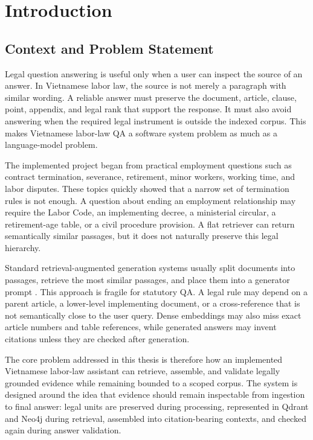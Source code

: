 \section{Introduction}

\subsection{Context and Problem Statement}
Legal question answering is useful only when a user can inspect the source of an answer. In Vietnamese labor law, the source is not merely a paragraph with similar wording. A reliable answer must preserve the document, article, clause, point, appendix, and legal rank that support the response. It must also avoid answering when the required legal instrument is outside the indexed corpus. This makes Vietnamese labor-law QA a software system problem as much as a language-model problem.

The implemented project began from practical employment questions such as contract termination, severance, retirement, minor workers, working time, and labor disputes. These topics quickly showed that a narrow set of termination rules is not enough. A question about ending an employment relationship may require the Labor Code, an implementing decree, a ministerial circular, a retirement-age table, or a civil procedure provision. A flat retriever can return semantically similar passages, but it does not naturally preserve this legal hierarchy.

Standard retrieval-augmented generation systems usually split documents into passages, retrieve the most similar passages, and place them into a generator prompt \cite{lewis2020retrieval}. This approach is fragile for statutory QA. A legal rule may depend on a parent article, a lower-level implementing document, or a cross-reference that is not semantically close to the user query. Dense embeddings may also miss exact article numbers and table references, while generated answers may invent citations unless they are checked after generation.

The core problem addressed in this thesis is therefore how an implemented Vietnamese labor-law assistant can retrieve, assemble, and validate legally grounded evidence while remaining bounded to a scoped corpus. The system is designed around the idea that evidence should remain inspectable from ingestion to final answer: legal units are preserved during processing, represented in Qdrant and Neo4j during retrieval, assembled into citation-bearing contexts, and checked again during answer validation.

